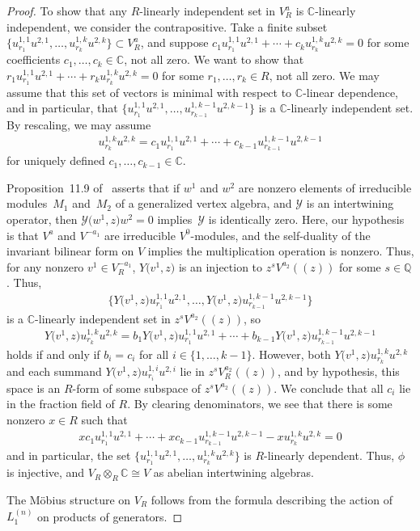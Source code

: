 \documentclass[11pt]{article}
\newcommand{\bC}{\mathbb{C}}
\newcommand{\bQ}{\mathbb{Q}}
\newcommand{\cY}{\mathcal{Y}}
\theoremstyle{definition}
\begin{document}
\begin{proof}
To show that any $R$-linearly independent set in $V^a_R$ is $\bC$-linearly independent, we consider the contrapositive. Take a finite subset $\big\{ u^{1,1}_{r_1}u^{2,1},\ldots, u^{1,k}_{r_k} u^{2,k} \big\} \subset V^a_R$, and suppose $c_1 u^{1,1}_{r_1}u^{2,1} + \cdots + c_k u^{1,k}_{r_k} u^{2,k} = 0$ for some coefficients $c_1,\ldots,c_k \in \bC$, not all zero. We want to show that $r_1 u^{1,1}_{r_1}u^{2,1} + \cdots + r_k u^{1,k}_{r_k} u^{2,k} = 0$ for some $r_1,\ldots,r_k \in R$, not all zero. We may assume that this set of vectors is minimal with respect to $\bC$-linear dependence, and in particular, that $\big\{ u^{1,1}_{r_1}u^{2,1},\ldots, u^{1,k-1}_{r_{k-1}} u^{2,k-1} \big\}$ is a $\bC$-linearly independent set. By rescaling, we may assume
\begin{gather*} u^{1,k}_{r_k} u^{2,k} = c_1 u^{1,1}_{r_1}u^{2,1} + \cdots + c_{k-1} u^{1,k-1}_{r_{k-1}} u^{2,k-1} \end{gather*}
for uniquely defined $c_1,\ldots, c_{k-1} \in \bC$.

Proposition~11.9 of~\cite{DL93} asserts that if $w^1$ and $w^2$ are nonzero elements of irreducible mo\-dules~$M_1$ and~$M_2$ of a generalized vertex algebra, and $\cY$ is an intertwining operator, then $\cY\big(w^1,z\big)w^2 = 0$ implies~$\cY$ is identically zero. Here, our hypothesis is that $V^a$ and $V^{-a_1}$ are irreducible $V^0$-modules, and the self-duality of the invariant bilinear form on $V$ implies the multiplication operation is nonzero. Thus, for any nonzero $v^1 \in V^{-a_1}_R$, $Y\big(v^1,z\big)$ is an injection to $z^s V^{a_2}((z))$ for some $s \in \bQ$. Thus,
\begin{gather*} \big\{ Y\big(v^1,z\big) u^{1,1}_{r_1}u^{2,1}, \ldots, Y\big(v^1,z\big) u^{1,k-1}_{r_{k-1}} u^{2,k-1} \big\} \end{gather*}
is a $\bC$-linearly independent set in $z^s V^{a_2}((z))$, so
\begin{gather*} Y\big(v^1,z\big) u^{1,k}_{r_k} u^{2,k} = b_1 Y\big(v^1,z\big) u^{1,1}_{r_1}u^{2,1} + \cdots + b_{k-1} Y\big(v^1,z\big) u^{1,k-1}_{r_{k-1}} u^{2,k-1} \end{gather*}
holds if and only if $b_i = c_i$ for all $i \in \{1,\ldots,k-1\}$. However, both $Y\big(v^1,z\big) u^{1,k}_{r_k} u^{2,k}$ and each summand $Y\big(v^1,z\big) u^{1,i}_{r_i}u^{2,i}$ lie in $z^sV^{a_2}_R((z))$, and by hypothesis, this space is an $R$-form of some subspace of $z^sV^{a_2}((z))$. We conclude that all $c_i$ lie in the fraction field of $R$. By clearing denominators, we see that there is some nonzero $x \in R$ such that
\begin{gather*} xc_1 u^{1,1}_{r_1}u^{2,1} + \cdots + xc_{k-1} u^{1,k-1}_{r_{k-1}} u^{2,k-1} - x u^{1,k}_{r_k} u^{2,k} = 0 \end{gather*}
and in particular, the set $\big\{ u^{1,1}_{r_1}u^{2,1},\ldots, u^{1,k}_{r_k} u^{2,k} \big\}$ is $R$-linearly dependent. Thus, $\phi$ is injective, and $V_R \otimes_{R} \bC \cong V$ as abelian intertwining algebras.

The M\"obius structure on $V_R$ follows from the formula describing the action of $L_1^{(n)}$ on products of generators.
\end{proof}
\end{document}
